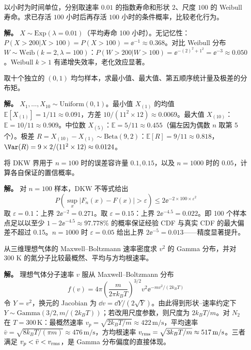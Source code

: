 \begin{exbox}[指数分布的无记忆性验证]
以小时为时间单位，分别取速率 $0.01$ 的指数寿命和形状 $2$、尺度 $100$ 的 Weibull 寿命。求已存活 $100$ 小时后再存活 $100$ 小时的条件概率，比较老化行为。

\textbf{解。} $X\sim\mathrm{Exp}(\lambda=0.01)$（平均寿命 100 小时）。无记忆性：$P(X>200|X>100)=P(X>100)=\ee^{-1}\approx0.368$。对比 Weibull 分布 $W\sim\mathrm{Weib}(k=2,\lambda=100)$：$P(W>200|W>100)=\ee^{-(2)^2+1^2}=\ee^{-3}\approx0.050$。Weibull $k>1$ 有递增失效率，老化效应显著。
\end{exbox}
\begin{exbox}[$n=10$ 均匀分布的顺序统计量]
取十个独立的 $(0,1)$ 均匀样本，求最小值、最大值、第五顺序统计量及极差的分布矩。

\textbf{解。} $X_1,\ldots,X_{10}\sim\mathrm{Uniform}(0,1)$。最小值 $X_{(1)}$ 的均值 $\mathbb E[X_{(1)}]=1/11\approx0.091$，方差 $10/(11^2\times12)\approx0.0069$。最大值 $X_{(10)}$：$\mathbb E=10/11\approx0.909$。中位数 $X_{(5)}$：$\mathbb E=5/11\approx0.455$（偏左因为偶数 $n$ 取第 5 个）。极差 $R=X_{(10)}-X_{(1)}\sim\mathrm{Beta}(9,2)$：$\mathbb E[R]=9/11\approx0.818$，$\Var(R)=9\times2/(11^2\times12)\approx0.0124$。
\end{exbox}
\begin{exbox}
将 DKW 界用于 $n=100$ 时的误差容许量 $0.1,0.15$，以及 $n=1000$ 时的 $0.05$，计算各自保证的置信概率。

\textbf{解。} 对 $n=100$ 样本，DKW 不等式给出
\[
P\!\left(\sup_x|F_n(x)-F(x)|>\varepsilon\right)\le2\ee^{-2\times100\times\varepsilon^2}
\]
取 $\varepsilon=0.1$：上界 $2\ee^{-2}=0.271$。取 $\varepsilon=0.15$：上界 $2\ee^{-4.5}=0.022$。即 100 个样本点足以以至少 $1-2\ee^{-4.5}\approx97.778\%$ 的概率保证经验 CDF 与真实 CDF 的最大偏差不超过 0.15。$n=1000$ 时 $\varepsilon=0.05$ 给出上界 $2\ee^{-5}=0.013$——精度显著提升。
\end{exbox}
\begin{exbox}
从三维理想气体的 Maxwell--Boltzmann 速率密度求 $v^2$ 的 Gamma 分布，并对 $300$ K 的氮分子比较最概然、平均与方均根速率。

\textbf{解。} 理想气体分子速率 $v$ 服从 Maxwell--Boltzmann 分布
\[
f(v)=4\pi\left(\frac{m}{2\pi k_BT}\right)^{3/2}v^2 \ee^{-mv^2/(2k_BT)}
\]
令 $Y=v^2$，换元的 Jacobian 为 $\dd v=\dd Y/(2\sqrt Y)$。由此得到形状--速率约定下 $Y\sim\mathrm{Gamma}(3/2,m/(2k_BT))$；若改用尺度参数，则尺度为 $2k_BT/m$。对 $N_2$ 在 $T=300\,\mathrm{K}$：最概然速率 $v_p=\sqrt{2k_BT/m}\approx422\,\mathrm{m/s}$，平均速率 $\bar v=\sqrt{8k_BT/(\pi m)}\approx476\,\mathrm{m/s}$，方均根速率 $v_{\rm rms}=\sqrt{3k_BT/m}\approx517\,\mathrm{m/s}$。三者满足 $v_p<\bar v<v_{\rm rms}$，是 Gamma 分布偏度的直接体现。
\end{exbox}




